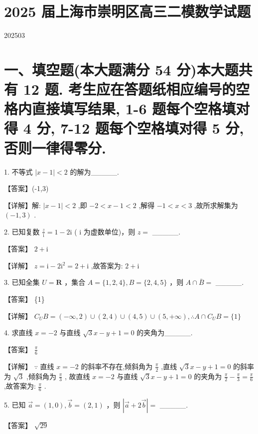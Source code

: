 \documentclass[10pt]{article}
\begin{document}
\section*{2025 届上海市崇明区高三二模数学试题}

202503

\section*{一、填空题(本大题满分 54 分)本大题共有 12 题. 考生应在答题纸相应编号的空格内直接填写结果, 1-6 题每个空格填对得 4 分, 7-12 题每个空格填对得 5 分, 否则一律得零分.}

1. 不等式 \(\left| {x - 1}\right|  < 2\) 的解为\_\_\_\_\_.

【答案】(-1,3)

【详解】解: \(\left| {x - 1}\right|  < 2\) ,即 \(- 2 < x - 1 < 2\) ,解得 \(- 1 < x < 3\) ,故所求解集为 \(\left( {-1,3}\right)\) .

2. 已知复数 \(\frac{z}{\mathrm{i}} = 1 - 2\mathrm{i}\) ( \(\mathrm{i}\) 为虚数单位)，则 \(z =\) \_\_\_\_\_.

【答案】 \(2 + \mathrm{i}\)

【详解】 \(z = \mathrm{i} - 2{\mathrm{i}}^{2} = 2 + \mathrm{i}\) ,故答案为: \(2 + \mathrm{i}\)

3. 已知全集 \(U = \mathbf{R}\) ，集合 \(A = \{ 1,2,4\} ,B = \{ 2,4,5\}\) ，则 \(A \cap  \bar{B} =\) \_\_\_\_\_.

【答案】 \{1\}

【详解】 \({C}_{U}B = \left( {-\infty ,2}\right)  \cup  \left( {2,4}\right)  \cup  \left( {4,5}\right)  \cup  \left( {5, + \infty }\right) ,\therefore A \cap  {C}_{U}B = \{ 1\}\)

4. 求直线 \(x =  - 2\) 与直线 \(\sqrt{3}x - y + 1 = 0\) 的夹角为\_\_\_\_\_.

【答案】 \(\frac{\pi }{6}\)

【详解】 \(\because\) 直线 \(x =  - 2\) 的斜率不存在,倾斜角为 \(\frac{\pi }{2}\) ,直线 \(\sqrt{3}x - y + 1 = 0\) 的斜率为 \(\sqrt{3}\) ,倾斜角为 \(\frac{\pi }{3}\) , 故直线 \(x =  - 2\) 与直线 \(\sqrt{3}x - y + 1 = 0\) 的夹角为 \(\frac{\pi }{2} - \frac{\pi }{3} = \frac{\pi }{6}\) ,故答案为: \(\frac{\pi }{6}\) .

5. 已知 \(\overrightarrow{a} = \left( {1,0}\right) ,\overrightarrow{b} = \left( {2,1}\right)\) ，则 \(\left| {\overrightarrow{a} + 2\overrightarrow{b}}\right|  =\) \_\_\_\_\_.

【答案】 \(\sqrt{29}\)
\end{document}
